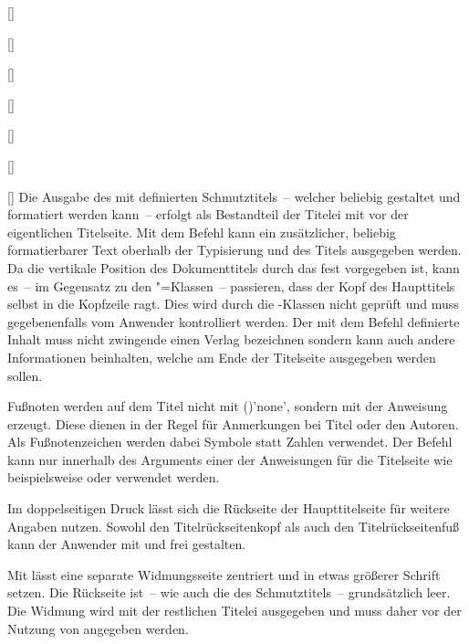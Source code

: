 \begin{Declaration*}{}
\begin{Declaration*}{}
\begin{Declaration*}{}
\begin{Bundle}{}
\begin{Declaration}{[]}
\begin{Declaration}{[]}
\begin{Declaration}{[]}
\begin{Declaration}{[]}
\begin{Declaration}{[]}
\begin{Declaration}{[]}
\begin{Declaration}{[]}
Die Ausgabe des mit  definierten Schmutztitels~-- welcher 
beliebig gestaltet und formatiert werden kann~-- erfolgt als Bestandteil der 
Titelei mit  vor der eigentlichen Titelseite. Mit dem Befehl 
 kann ein zusätzlicher, beliebig formatierbarer Text oberhalb 
der Typisierung und des Titels ausgegeben werden. Da die vertikale Position des 
Dokumenttitels durch das \CD fest vorgegeben ist, kann es~-- im Gegensatz zu 
den \KOMAScript"=Klassen~-- passieren, dass der Kopf des Haupttitels selbst in 
die Kopfzeile ragt. Dies wird durch die \TUDScript-Klassen nicht geprüft und 
muss gegebenenfalls vom Anwender kontrolliert werden. Der mit dem Befehl 
 definierte Inhalt muss nicht zwingende einen Verlag 
bezeichnen sondern kann auch andere Informationen beinhalten, welche am Ende 
der Titelseite ausgegeben werden sollen.

Fußnoten werden auf dem Titel nicht mit 
()'none', sondern mit der Anweisung 
 erzeugt. Diese dienen in der Regel für Anmerkungen bei Titel 
oder den Autoren. Als Fußnotenzeichen werden dabei Symbole statt Zahlen 
verwendet. Der Befehl  kann nur innerhalb des Arguments einer der 
Anweisungen für die Titelseite wie beispielsweise  oder 
 verwendet werden.

%
Im doppelseitigen Druck lässt sich die Rückseite der Haupttitelseite für 
weitere Angaben nutzen. Sowohl den Titelrückseitenkopf als auch den
Titelrückseitenfuß kann der Anwender mit  und 
 frei gestalten.

Mit  lässt eine separate Widmungsseite zentriert und in etwas 
größerer Schrift setzen. Die Rückseite ist~-- wie auch die des Schmutztitels~-- 
grundsätzlich leer. Die Widmung wird mit der restlichen Titelei ausgegeben und 
muss daher vor der Nutzung von  angegeben werden.
%
\end{Declaration}
\end{Declaration}
\end{Declaration}
\end{Declaration}
\end{Declaration}
\end{Declaration}
\end{Declaration}
\end{Bundle}


\end{Declaration*}
\end{Declaration*}
\end{Declaration*}
